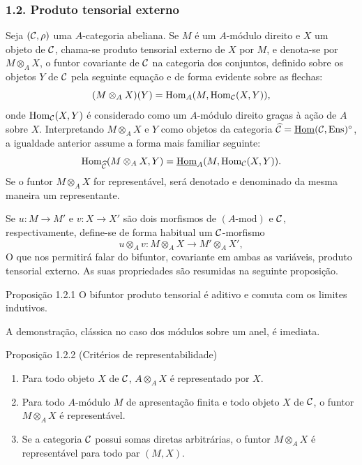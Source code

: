 \subsubsection*{1.2. Produto tensorial externo}
Seja $(\mathcal C,\rho)$ uma $A$-categoria abeliana. Se $M$ é um $A$-módulo direito e $X$ um objeto de $\mathcal C$, chama-se produto tensorial externo de $X$ por $M$, e denota-se por $M\otimes_A X$, o funtor covariante de $\mathcal C$ na categoria dos conjuntos, definido sobre os objetos $Y$ de $\mathcal C$ pela seguinte equação e de forma evidente sobre as flechas:
\[
(M\otimes_A X)(Y)=\operatorname{Hom}_A(M,\operatorname{Hom}_{\mathcal C}(X,Y)),
\]
onde $\operatorname{Hom}_{\mathcal C}(X,Y)$ é considerado como um $A$-módulo direito graças à ação de $A$ sobre $X$. Interpretando $M\otimes_AX$ e $Y$ como objetos da categoria $\widehat{\mathcal C}=\underline{\operatorname{Hom}}(\mathcal C,\operatorname{Ens})^{\circ}$, a igualdade anterior assume a forma mais familiar seguinte:
\[
\operatorname{Hom}_{\widehat{\mathcal C}}(M\otimes_A X,Y)=\underline{\operatorname{Hom}}_A(M,\operatorname{Hom}_{\mathcal C}(X,Y)).
\]
Se o funtor $M\otimes_A X$ for representável, será denotado e denominado da mesma maneira um representante.

Se $u:M\to M'$ e $v:X\to X'$ são dois morfismos de $(A\text{-mod})$ e $\mathcal C$, respectivamente, define-se de forma habitual um $\mathcal C$-morfismo
\[
u\otimes_A v:M\otimes_A X\longrightarrow M'\otimes_A X',
\]
O que nos permitirá falar do bifuntor, covariante em ambas as variáveis, produto tensorial externo. As suas propriedades são resumidas na seguinte proposição.

\begin{statement}{Proposição 1.2.1}
O bifuntor produto tensorial é aditivo e comuta com os limites indutivos.
\end{statement}
A demonstração, clássica no caso dos módulos sobre um anel, é imediata.

\begin{statement}{Proposição 1.2.2 (Critérios de representabilidade)}
\begin{enumerate}[label=(\alph*)]
\item Para todo objeto $X$ de $\mathcal C$, $A\otimes_AX$ é representado por $X$.
\item Para todo $A$-módulo $M$ de apresentação finita e todo objeto $X$ de $\mathcal C$, o funtor $M\otimes_AX$ é representável.
\item Se a categoria $\mathcal C$ possui somas diretas arbitrárias, o funtor $M\otimes_A X$ é representável para todo par $(M,X)$.
\end{enumerate}
\end{statement}


